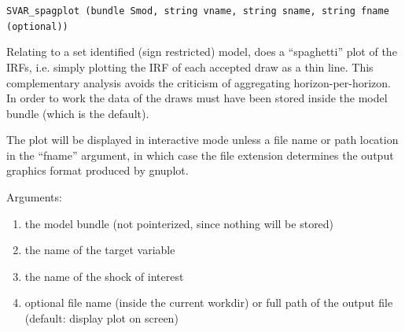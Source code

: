 \documentclass[a4paper,10pt]{article}
\newenvironment{funcdoc}[1]
{\noindent\hrulefill\newline\nopagebreak\texttt{#1}%
\nopagebreak\par\noindent\hrulefill%
\nopagebreak\par\nopagebreak\smallskip\nopagebreak\par}
{\bigskip}
\begin{document}
\begin{funcdoc}{SVAR\_spagplot (bundle Smod, string vname, string sname, 
 string fname (optional))}
 \noindent Relating to a set identified (sign restricted) model, does a 
  ``spaghetti'' plot of the IRFs, i.e. simply plotting the IRF of each accepted
  draw as a thin line. This complementary analysis avoids the criticism of 
  aggregating horizon-per-horizon. 
 In order to work the data of the draws must have been stored inside the model
  bundle (which is the default).

  The plot will be displayed in interactive mode unless a file name or path
  location in the ``fname'' argument, in which case the file extension determines
  the output graphics format produced by gnuplot.
 
 \noindent Arguments:
 \begin{enumerate}
  \item the model bundle (not pointerized, since nothing will be stored)
  \item the name of the target variable
  \item the name of the shock of interest
  \item optional file name (inside the current workdir) or full path of the output file 
   (default: display plot on screen)
 \end{enumerate}


\end{funcdoc}
\end{document}
